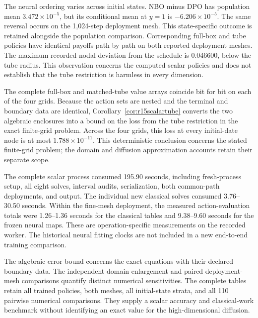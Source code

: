 The neural ordering varies across initial states. NBO minus DPO has population mean $3.472\times10^{-5}$, but its conditional mean at $y=1$ is $-6.206\times10^{-5}$. The same reversal occurs on the 1,024-step deployment mesh. This state-specific outcome is retained alongside the population comparison. Corresponding full-box and tube policies have identical payoffs path by path on both reported deployment meshes. The maximum recorded nodal deviation from the schedule is 0.046600, below the tube radius. This observation concerns the computed scalar policies and does not establish that the tube restriction is harmless in every dimension.

The complete full-box and matched-tube value arrays coincide bit for bit on each of the four grids. Because the action sets are nested and the terminal and boundary data are identical, Corollary~\ref{cor:r15scalartube} converts the two algebraic enclosures into a bound on the loss from the tube restriction in the exact finite-grid problem. Across the four grids, this loss at every initial-date node is at most $1.788\times10^{-11}$. This deterministic conclusion concerns the stated finite-grid problem; the domain and diffusion approximation accounts retain their separate scope.

The complete scalar process consumed 195.90 seconds, including fresh-process setup, all eight solves, interval audits, serialization, both common-path deployments, and output. The individual new classical solves consumed 3.76--30.50 seconds. Within the fine-mesh deployment, the measured action-evaluation totals were 1.26--1.36 seconds for the classical tables and 9.38--9.60 seconds for the frozen neural maps. These are operation-specific measurements on the recorded worker. The historical neural fitting clocks are not included in a new end-to-end training comparison.

The algebraic error bound concerns the exact equations with their declared boundary data. The independent domain enlargement and paired deployment-mesh comparisons quantify distinct numerical sensitivities. The complete tables retain all trained policies, both meshes, all initial-state strata, and all 110 pairwise numerical comparisons. They supply a scalar accuracy and classical-work benchmark without identifying an exact value for the high-dimensional diffusion.
